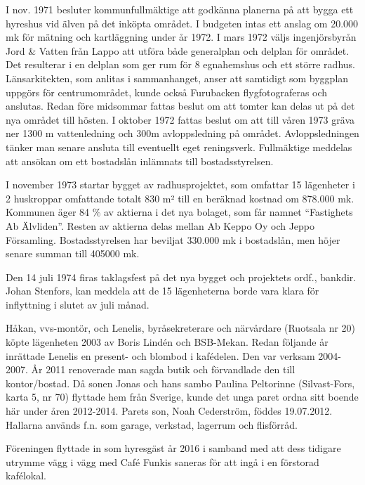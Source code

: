 I nov. 1971 besluter kommunfullmäktige att godkänna planerna på att bygga ett hyreshus vid älven på det inköpta området. I budgeten intas ett anslag om 20.000 mk för mätning och kartläggning under år 1972. I mars 1972 väljs ingenjörsbyrån Jord \& Vatten från Lappo att utföra både generalplan och delplan för området. Det resulterar i en delplan som ger rum för 8 egnahemshus och ett större radhus. Länsarkitekten, som anlitas i sammanhanget, anser att samtidigt som byggplan uppgörs för centrumområdet, kunde också Furubacken flygfotograferas och anslutas. Redan före midsommar fattas beslut om att tomter kan delas ut på det nya området till hösten. I oktober 1972 fattas beslut om att till våren 1973 gräva ner 1300 m vattenledning och 300m avloppsledning på området. Avloppsledningen tänker man senare ansluta till eventuellt eget reningsverk. Fullmäktige meddelas att ansökan om ett bostadslån inlämnats till bostadsstyrelsen.

I november 1973 startar bygget av radhusprojektet, som omfattar 15 lägenheter i 2 huskroppar omfattande totalt 830 m² till en beräknad kostnad om 878.000 mk. Kommunen äger 84 \% av aktierna i det nya bolaget, som får namnet ``Fastighets Ab Älvliden''. Resten av aktierna delas mellan Ab Keppo Oy och Jeppo Församling. Bostadsstyrelsen har beviljat 330.000 mk i bostadslån, men höjer senare summan till 405000 mk.

Den 14 juli 1974 firas taklagsfest på det nya bygget och projektets ordf., bankdir. Johan Stenfors, kan meddela att de 15 lägenheterna borde vara klara för inflyttning i slutet av juli månad.




Håkan, vvs-montör, och Lenelis, byråsekreterare och närvårdare (Ruotsala nr 20) köpte lägenheten 2003 av Boris Lindén och BSB-Mekan. Redan följande år inrättade Lenelis en present- och blombod 	i kafédelen. Den var verksam 2004-2007. År 2011 renoverade man sagda butik och förvandlade den till	kontor/bostad. Då sonen Jonas och hans sambo Paulina Peltorinne	(Silvast-Fors, karta 5, nr 70) flyttade hem från Sverige, kunde det unga paret ordna sitt boende här under åren 2012-2014. Parets son, Noah Cederström, föddes 19.07.2012.
Hallarna används f.n. som garage, verkstad, lagerrum och flisförråd.



Föreningen flyttade in som hyresgäst år 2016 i samband med att dess tidigare utrymme vägg i vägg med Café Funkis saneras för att	ingå i en förstorad kafélokal.


